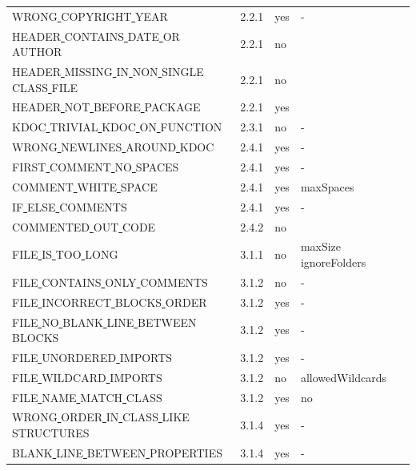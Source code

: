 \begin{center}
\begin{longtable}{ |l|p{0.8cm}|p{0.8cm}| p{3cm} | }
WRONG\underline{ }COPYRIGHT\underline{ }YEAR & 2.2.1 &  yes  &  - \\
HEADER\underline{ }CONTAINS\underline{ }DATE\underline{ }OR\underline{ }AUTHOR & 2.2.1 &  no  &   \\
HEADER\underline{ }MISSING\underline{ }IN\underline{ }NON\underline{ }SINGLE\underline{ }CLASS\underline{ }FILE & 2.2.1 &  no  &   \\
HEADER\underline{ }NOT\underline{ }BEFORE\underline{ }PACKAGE & 2.2.1 &  yes  &   \\
KDOC\underline{ }TRIVIAL\underline{ }KDOC\underline{ }ON\underline{ }FUNCTION & 2.3.1 &  no  &   - \\
WRONG\underline{ }NEWLINES\underline{ }AROUND\underline{ }KDOC & 2.4.1 &  yes  &  - \\
FIRST\underline{ }COMMENT\underline{ }NO\underline{ }SPACES & 2.4.1 &  yes  &  - \\
COMMENT\underline{ }WHITE\underline{ }SPACE & 2.4.1 &  yes  &  maxSpaces \\
IF\underline{ }ELSE\underline{ }COMMENTS & 2.4.1 &  yes  &  - \\
COMMENTED\underline{ }OUT\underline{ }CODE & 2.4.2 &  no  &   \\
FILE\underline{ }IS\underline{ }TOO\underline{ }LONG & 3.1.1 &  no  &  maxSize  ignoreFolders \\
FILE\underline{ }CONTAINS\underline{ }ONLY\underline{ }COMMENTS & 3.1.2 &  no  &                          - \\
FILE\underline{ }INCORRECT\underline{ }BLOCKS\underline{ }ORDER & 3.1.2 &  yes  &                          - \\
FILE\underline{ }NO\underline{ }BLANK\underline{ }LINE\underline{ }BETWEEN\underline{ }BLOCKS & 3.1.2 &  yes  &                          - \\
FILE\underline{ }UNORDERED\underline{ }IMPORTS & 3.1.2 &  yes  &                          - \\
FILE\underline{ }WILDCARD\underline{ }IMPORTS & 3.1.2 &  no  &  allowedWildcards          \\
FILE\underline{ }NAME\underline{ }MATCH\underline{ }CLASS & 3.1.2 &  yes  &  no \\
WRONG\underline{ }ORDER\underline{ }IN\underline{ }CLASS\underline{ }LIKE\underline{ }STRUCTURES & 3.1.4 &  yes  &                          - \\
BLANK\underline{ }LINE\underline{ }BETWEEN\underline{ }PROPERTIES & 3.1.4 &  yes  &                          - \\

\end{longtable}
\end{center}
